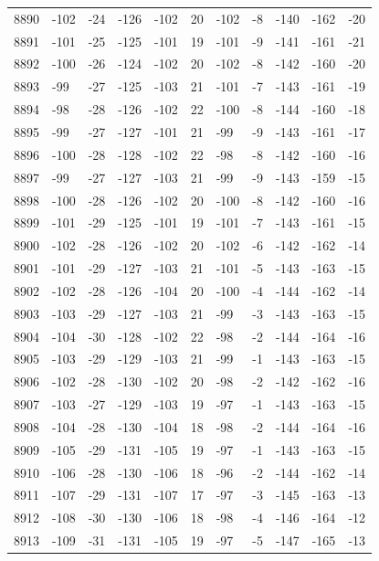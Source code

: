 \begin{table}[H]
\begin{tabular}{lllllllllll}
8890 & -102 & -24 & -126 & -102 & 20 & -102 & -8 & -140 & -162 & -20 \\
8891 & -101 & -25 & -125 & -101 & 19 & -101 & -9 & -141 & -161 & -21 \\
8892 & -100 & -26 & -124 & -102 & 20 & -102 & -8 & -142 & -160 & -20 \\
8893 & -99 & -27 & -125 & -103 & 21 & -101 & -7 & -143 & -161 & -19 \\
8894 & -98 & -28 & -126 & -102 & 22 & -100 & -8 & -144 & -160 & -18 \\
8895 & -99 & -27 & -127 & -101 & 21 & -99 & -9 & -143 & -161 & -17 \\
8896 & -100 & -28 & -128 & -102 & 22 & -98 & -8 & -142 & -160 & -16 \\
8897 & -99 & -27 & -127 & -103 & 21 & -99 & -9 & -143 & -159 & -15 \\
8898 & -100 & -28 & -126 & -102 & 20 & -100 & -8 & -142 & -160 & -16 \\
8899 & -101 & -29 & -125 & -101 & 19 & -101 & -7 & -143 & -161 & -15 \\
8900 & -102 & -28 & -126 & -102 & 20 & -102 & -6 & -142 & -162 & -14 \\
8901 & -101 & -29 & -127 & -103 & 21 & -101 & -5 & -143 & -163 & -15 \\
8902 & -102 & -28 & -126 & -104 & 20 & -100 & -4 & -144 & -162 & -14 \\
8903 & -103 & -29 & -127 & -103 & 21 & -99 & -3 & -143 & -163 & -15 \\
8904 & -104 & -30 & -128 & -102 & 22 & -98 & -2 & -144 & -164 & -16 \\
8905 & -103 & -29 & -129 & -103 & 21 & -99 & -1 & -143 & -163 & -15 \\
8906 & -102 & -28 & -130 & -102 & 20 & -98 & -2 & -142 & -162 & -16 \\
8907 & -103 & -27 & -129 & -103 & 19 & -97 & -1 & -143 & -163 & -15 \\
8908 & -104 & -28 & -130 & -104 & 18 & -98 & -2 & -144 & -164 & -16 \\
8909 & -105 & -29 & -131 & -105 & 19 & -97 & -1 & -143 & -163 & -15 \\
8910 & -106 & -28 & -130 & -106 & 18 & -96 & -2 & -144 & -162 & -14 \\
8911 & -107 & -29 & -131 & -107 & 17 & -97 & -3 & -145 & -163 & -13 \\
8912 & -108 & -30 & -130 & -106 & 18 & -98 & -4 & -146 & -164 & -12 \\
8913 & -109 & -31 & -131 & -105 & 19 & -97 & -5 & -147 & -165 & -13 \\

\end{tabular}
\end{table}
